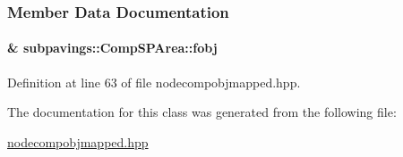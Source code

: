 \subsubsection{\-Member \-Data \-Documentation}
\hypertarget{classsubpavings_1_1CompSPArea_aff332dcd6dc387f8f0a8f290c2bad73e}{
\paragraph[{fobj}]{\& {\bf subpavings\-::\-Comp\-S\-P\-Area\-::fobj}}}\label{classsubpavings_1_1CompSPArea_aff332dcd6dc387f8f0a8f290c2bad73e}


\-Definition at line 63 of file nodecompobjmapped.\-hpp.



\-The documentation for this class was generated from the following file\-:\begin{DoxyCompactItemize}
\item 
\hyperlink{nodecompobjmapped_8hpp}{nodecompobjmapped.\-hpp}\end{DoxyCompactItemize}
